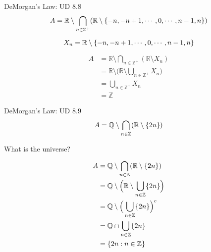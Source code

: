 \begin{frame}{}
  \begin{exampleblock}{DeMorgan's Law: UD $8.8$}
    \[
      A = \mathbb{R} \setminus \bigcap_{n \in \mathbb{Z}^{+}} (\mathbb{R} \setminus \{-n, -n+1, \cdots, 0, \cdots, n-1, n\})
    \]
  \end{exampleblock}

  \pause
  \[
    X_n = \mathbb{R} \setminus \{-n, -n+1, \cdots, 0, \cdots, n-1, n\}
  \]

  \pause
  \begin{align*}
     A &= \mathbb{R} \setminus \bigcap_{n \in \mathbb{Z}^{+}} (\mathbb{R} \setminus X_n)\\
       &= \mathbb{R} \setminus \Big(\mathbb{R} \setminus \bigcup_{n \in \mathbb{Z}^{+}} X_n \Big) \\
       &= \bigcup_{n \in \mathbb{Z}^{+}} X_n \\
       &= \mathbb{Z}
  \end{align*}
\end{frame}

\begin{frame}{}
  \begin{exampleblock}{DeMorgan's Law: UD $8.9$}
    \[
      A = \mathbb{Q} \setminus \bigcap_{n \in \mathbb{Z}} (\mathbb{R} \setminus \{2n\})
    \]
  \end{exampleblock}

  \pause
  \vspace{0.50cm}
  \centerline{ What is the  universe?}

  \pause
  \begin{align*}
     A &= \mathbb{Q} \setminus \bigcap_{n \in \mathbb{Z}} (\mathbb{R} \setminus \{2n\}) \\
     &= \mathbb{Q} \setminus \Big(\mathbb{R} \setminus \bigcup_{n \in \mathbb{Z}} \{2n\} \Big) \\
     &= \mathbb{Q} \setminus \Big(\bigcup_{n \in \mathbb{Z}} \{2n\}\Big)^{c} \\
     &= \mathbb{Q} \cap \bigcup_{n \in \mathbb{Z}} \{2n\}\\
     &= \{2n: n \in \mathbb{Z}\}
  \end{align*}
\end{frame}
